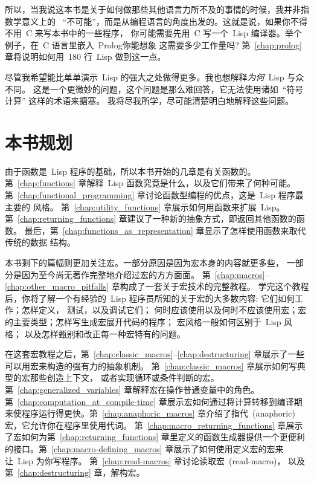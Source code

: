 所以，当我说这本书是关于如何做那些其他语言力所不及的事情的时候，我并非指数学意义上的~
``不可能''，而是从编程语言的角度出发的。这就是说，如果你不得不用~C 来写本书中的一些程序，
你可能需要先用~C 写一个~Lisp 编译器。举个例子，在~C 语言里嵌入~Prolog\pozhehao{}你能想象
这需要多少工作量吗?
第~\ref{chap:prolog} 章将说明如何用~180 行~Lisp 做到这一点。

尽管我希望能比单单演示~Lisp 的强大之处做得更多。我也想解释\emph{为何}~Lisp 与众不同。
这是一个更微妙的问题，这个问题是那么难回答，它无法使用诸如~``符号计算'' 这样的术语来搪塞。
我将尽我所学，尽可能清楚明白地解释这些问题。

\section*{本书规划}
\label{sec:plan_of_the_book}

由于函数是~Lisp 程序的基础，所以本书开始的几章是有关函数的。
第~\ref{chap:functions} 章解释~Lisp 函数究竟是什么，以及它们带来了何种可能。
第~\ref{chap:functional_programming} 章讨论函数型编程的优点，这是~Lisp 程序最主要的
风格。
第~\ref{chap:utility_functions} 章展示如何用函数来扩展~Lisp。
第~\ref{chap:returning_functions} 章建议了一种新的抽象方式，即返回其他函数的函数。
最后，第~\ref{chap:functions_as_representation} 章显示了怎样使用函数来取代传统的数据
结构。

本书剩下的篇幅则更加关注宏。一部分原因是因为宏本身的内容就更多些，
一部分是因为至今尚无著作完整地介绍过宏的方方面面。
第~\ref{chap:macros}--\ref{chap:other_macro_pitfalls} 章构成了一套关于宏技术的完整教程。
学完这个教程后，你将了解一个有经验的~Lisp 程序员所知的关于宏的大多数内容: 它们如何工作；怎样定义，
测试，以及调试它们；
何时应该使用以及何时不应该使用宏；宏的主要类型；怎样写生成宏展开代码的程序；
宏风格一般如何区别于~Lisp 风格；
以及怎样甄别和改正每一种宏特有的问题。

在这套宏教程之后，第~\ref{chap:classic_macros}--\ref{chap:destructuring}
章展示了一些可以用宏来构造的强有力的抽象机制。
第~\ref{chap:classic_macros} 章展示如何写典型的宏\pozhehao{}那些创造上下文，
或者实现循环或条件判断的宏。
第~\ref{chap:generalized_variables} 章解释宏在操作普通变量中的角色。
第~\ref{chap:computation_at_compile-time}
章展示宏如何通过将计算转移到编译期来使程序运行得更快。第~\ref{chap:anaphoric_macros}
章介绍了指代~(anaphoric) 宏，它允许你在程序里使用代词。
第~\ref{chap:macro_returning_functions}
章展示了宏如何为第~\ref{chap:returning_functions} 
章里定义的函数生成器提供一个更便利的接口。第~\ref{chap:macro-defining_macros}
章展示了如何使用定义宏的宏来让~Lisp 为你写程序。
第~\ref{chap:read-macros} 章讨论读取宏~(read-macro)，
以及第~\ref{chap:destructuring} 章，解构宏。

